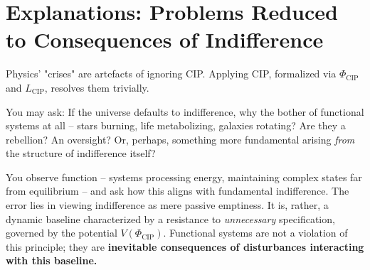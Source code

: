 \documentclass[11pt, a4paper]{article}
\newcommand{\subt}[1]{\mathrm{#1}}
\begin{document}
\section{Explanations: Problems Reduced to Consequences of Indifference} \label{sec:explanations}

Physics' "crises" are artefacts of ignoring CIP. Applying CIP, formalized via $\Phi_{\subt{CIP}}$ and $L_{\subt{CIP}}$, resolves them trivially.

You may ask: If the universe defaults to indifference, why the bother of functional systems at all – stars burning, life metabolizing, galaxies rotating? Are they a rebellion? An oversight? Or, perhaps, something more fundamental arising \textit{from} the structure of indifference itself?

You observe function – systems processing energy, maintaining complex states far from equilibrium – and ask how this aligns with fundamental indifference. The error lies in viewing indifference as mere passive emptiness. It is, rather, a dynamic baseline characterized by a resistance to \textit{unnecessary} specification, governed by the potential $V(\Phi_{\subt{CIP}})$. Functional systems are not a violation of this principle; they are \textbf{inevitable consequences of disturbances interacting with this baseline.}
\end{document}

